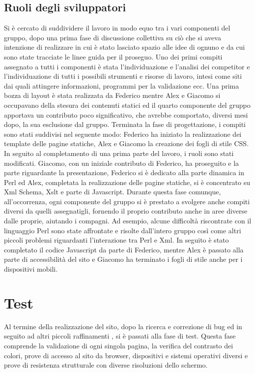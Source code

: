 \documentclass[a4paper]{article}
\begin{document}
\subsection{Ruoli degli sviluppatori}
Si è cercato di suddividere il lavoro in modo equo tra i vari componenti del gruppo, dopo una prima fase di discussione collettiva su ciò che si aveva intenzione di realizzare in cui è stato lasciato spazio alle idee di ognuno e da cui sono state tracciate le linee guida per il proseguo.
Uno dei primi compiti assegnato a tutti i componenti è stata l'individuazione e l'analisi dei competitor e l'individuazione di tutti i possibili strumenti e risorse di lavoro, intesi come siti dai quali attingere informazioni, programmi per la validazione ecc.
Una prima bozza di layout è stata realizzata da Federico mentre Alex e Giacomo si occupavano della stesura dei contenuti statici ed il quarto componente del gruppo apportava un contributo poco significativo, che avrebbe comportato, diversi mesi dopo, la sua esclusione dal gruppo. Terminata la fase di progettazione, i compiti sono stati suddivisi nel seguente modo: Federico ha iniziato la realizzazione dei template delle pagine statiche, Alex e Giacomo la creazione dei fogli di stile CSS.
In seguito al completamento di una prima parte del lavoro, i ruoli sono stati modificati. Giacomo, con un iniziale contributo di Federico, ha proseguito e la parte riguardante la presentazione, Federico si è dedicato alla parte dinamica in Perl ed Alex, completata la realizzazione delle pagine statiche, si è concentrato su Xml Schema, Xslt e parte di Javascript.
Durante questa fase comunque, all'occorrenza, ogni componente del gruppo si è prestato a svolgere anche compiti diversi da quelli assegnatigli, fornendo il proprio contributo anche in aree diverse dalle proprie, aiutando i compagni. Ad esempio, alcune difficoltà riscontrate con il linguaggio Perl sono state affrontate e risolte dall'intero gruppo così come altri piccoli problemi riguardanti l'interazione tra Perl e Xml.
In seguito è stato completato il codice Javascript da parte di Federico, mentre Alex è passato alla parte di accessibilità del sito e Giacomo ha terminato i fogli di stile anche per i dispositivi mobili.

\section{Test}
Al termine della realizzazione del sito, dopo la ricerca e correzione di bug ed in seguito ad altri piccoli raffinamenti , si è passati alla fase di test. Questa fase comprende la validazione di ogni singola pagina, la verifica del contrasto dei colori, prove di accesso al sito da browser, dispositivi e sistemi operativi diversi e prove di resistenza strutturale con diverse risoluzioni dello schermo.
\end{document}
